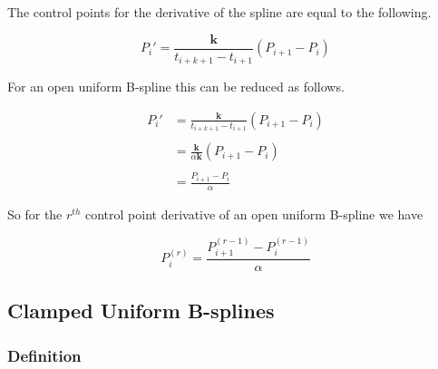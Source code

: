 \documentclass{article}
\begin{document}
\hspace{1cm}

The control points for the derivative of the spline are equal to the following.

\begin{equation}
    P_i' = \frac{\textbf{k}}{t_{i+k+1}-t_{i+1}}(P_{i+1} - P_{i})
\end{equation}

For an open uniform B-spline this can be reduced as follows.

\begin{equation}
\begin{aligned}
    P_i' & = \frac{\textbf{k}}{t_{i+k+1}-t_{i+1}}(P_{i+1} - P_{i}) \\ \\
    & = \frac{\textbf{k}}{\alpha \textbf{k}}(P_{i+1} - P_{i}) \\\\
    & = \frac{P_{i+1} - P_{i}}{\alpha}
\end{aligned}
\end{equation}

So for the \(r^{th}\) control point derivative of an open uniform B-spline we have

\begin{equation} \label{rth open control point derivative}
    P_i^{(r)} = \frac{P_{i+1}^{(r-1)} - P_{i}^{(r-1)} }{\alpha}
\end{equation}

\subsection{Clamped Uniform B-splines}

\subsubsection{Definition}
\end{document}
